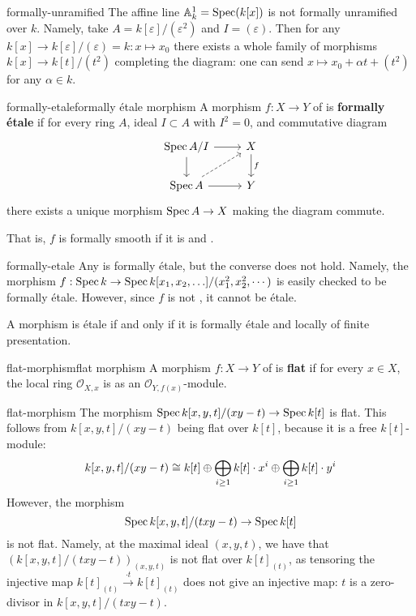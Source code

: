 \begin{example}{formally-unramified}
    The affine line $\mathbb{A}^1_k = \operatorname{Spec}(k[x])$ is not formally unramified over $k$. Namely, take $A = k[\varepsilon] / (\varepsilon^2)$ and $I = (\varepsilon)$. Then for any $k[x] \to k[\varepsilon]/(\varepsilon) = k : x \mapsto x_0$ there exists a whole family of morphisms $k[x] \to k[t]/(t^2)$ completing the diagram: one can send $x \mapsto x_0 + \alpha t + (t^2)$ for any $\alpha \in k$.
\end{example}

\begin{topic}{formally-etale}{formally étale morphism}
    A morphism $f : X \to Y$ of  is \textbf{formally étale} if for every ring $A$, ideal $I \subset A$ with $I^2 = 0$, and commutative diagram
    \[ \begin{tikzcd} \Spec A/I \arrow{r} \arrow{d} & X \arrow{d}{f} \\ \Spec A \arrow{r} \arrow[dashed]{ur} & Y \end{tikzcd} \]
    there exists a unique morphism $\operatorname{Spec} A \to X$ making the diagram commute.
    
    That is, $f$ is formally smooth if it is  and .
\end{topic}

\begin{example}{formally-etale}
    Any  is formally étale, but the converse does not hold. Namely, the morphism $f : \operatorname{Spec} k \to \operatorname{Spec} k[x_1, x_2, \ldots] / (x_1^2, x_2^2, \cdots)$ is easily checked to be formally étale. However, since $f$ is not , it cannot be étale.
    
    A morphism is étale if and only if it is formally étale and locally of finite presentation.
\end{example}

\begin{topic}{flat-morphism}{flat morphism}
    A morphism $f : X \to Y$ of  is \textbf{flat} if for every $x \in X$, the local ring $\mathcal{O}_{X, x}$ is  as an $\mathcal{O}_{Y, f(x)}$-module.
\end{topic}

\begin{example}{flat-morphism}
    The morphism $\operatorname{Spec} k[x, y, t] / (xy - t) \to \operatorname{Spec} k[t]$ is flat. This follows from $k[x, y, t] / (xy - t)$ being flat over $k[t]$, because it is a free $k[t]$-module:
    \[ k[x, y, t] / (xy - t) \cong k[t] \oplus \bigoplus_{i \ge 1} k[t] \cdot x^i \oplus \bigoplus_{i \ge 1} k[t] \cdot y^i \]
    However, the morphism
    \[ \operatorname{Spec} k[x, y, t] / (txy - t) \to \operatorname{Spec} k[t] \]
    is not flat. Namely, at the maximal ideal $(x, y, t)$, we have that $(k[x, y, t] / (txy - t))_{(x, y, t)}$ is not flat over $k[t]_{(t)}$, as tensoring the injective map $k[t]_{(t)} \xrightarrow{\cdot t} k[t]_{(t)}$ does not give an injective map: $t$ is a zero-divisor in $k[x, y, t] / (txy - t)$.
\end{example}

